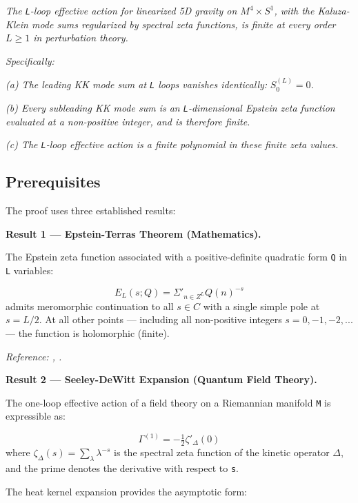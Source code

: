 \documentclass[aps,prd,preprint,superscriptaddress,longbibliography,floatfix]{revtex4-2}
\theoremstyle{remark}
\begin{document}
\textit{The \texttt{L}-loop effective action for linearized 5D gravity on $M^{4} \times S^{1}$, with the Kaluza-Klein mode sums regularized by spectral zeta functions, is finite at every order $L \geq 1$ in perturbation theory.}

\textit{Specifically:}

\textit{(a) The leading KK mode sum at \texttt{L} loops vanishes identically:} \textit{$S_{0}^{(L)} = 0$.}

\textit{(b) Every subleading KK mode sum is an \texttt{L}-dimensional Epstein zeta function evaluated at a non-positive integer, and is therefore finite.}

\textit{(c) The \texttt{L}-loop effective action is a finite polynomial in these finite zeta values.}



\subsection{Prerequisites}

The proof uses three established results:

\textbf{Result 1 --- Epstein-Terras Theorem (Mathematics).}

The Epstein zeta function associated with a positive-definite quadratic form \texttt{Q} in \texttt{L} variables:


\begin{equation}
    E_L(s; Q) = \Sigma'_{n \in Z^L} Q(n)^{-s}
\end{equation}
admits meromorphic continuation to all $s \in C$ with a single simple pole at $s = L/2$. At all other points --- including all non-positive integers $s = 0, -1, -2, ...$ --- the function is holomorphic (finite).

\textit{Reference: \cite{Epstein1903}, \cite{Terras1985}.}

\textbf{Result 2 --- Seeley-DeWitt Expansion (Quantum Field Theory).}

The one-loop effective action of a field theory on a Riemannian manifold \texttt{M} is expressible as:


\begin{equation}
    \Gamma^{(1)} = -\tfrac{1}{2} \zeta'_\Delta(0)
\end{equation}
where $\zeta_\Delta(s) = \sum_\lambda \lambda^{-s}$ is the spectral zeta function of the kinetic operator $\Delta$, and the prime denotes the derivative with respect to \texttt{s}.

The heat kernel expansion provides the asymptotic form:
\end{document}
